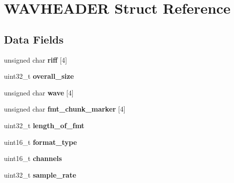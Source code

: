 \hypertarget{struct_w_a_v_h_e_a_d_e_r}{}\section{W\+A\+V\+H\+E\+A\+D\+ER Struct Reference}
\label{struct_w_a_v_h_e_a_d_e_r}
\subsection*{Data Fields}
\begin{DoxyCompactItemize}
\item 
\mbox{\label{struct_w_a_v_h_e_a_d_e_r_a5a14600e998a7fa28053a93ab69c59dc}} 
unsigned char {\bfseries riff} \mbox{[}4\mbox{]}
\item 
\mbox{\label{struct_w_a_v_h_e_a_d_e_r_aa32738f840f2e1f11fbb3d6934e3cee1}} 
uint32\+\_\+t {\bfseries overall\+\_\+size}
\item 
\mbox{\label{struct_w_a_v_h_e_a_d_e_r_a847be343b633c0ccaea5c0637431f56d}} 
unsigned char {\bfseries wave} \mbox{[}4\mbox{]}
\item 
\mbox{\label{struct_w_a_v_h_e_a_d_e_r_a69fff31085a4de24601ae5d45d70adc6}} 
unsigned char {\bfseries fmt\+\_\+chunk\+\_\+marker} \mbox{[}4\mbox{]}
\item 
\mbox{\label{struct_w_a_v_h_e_a_d_e_r_ab504bcdcab131e8fce33301bcd992746}} 
uint32\+\_\+t {\bfseries length\+\_\+of\+\_\+fmt}
\item 
\mbox{\label{struct_w_a_v_h_e_a_d_e_r_a73aa611a5cbe6339ffb26a697f6c13e2}} 
uint16\+\_\+t {\bfseries format\+\_\+type}
\item 
\mbox{\label{struct_w_a_v_h_e_a_d_e_r_a5cd1397103e8325b454a096624b4ac9e}} 
uint16\+\_\+t {\bfseries channels}
\item 
\mbox{\label{struct_w_a_v_h_e_a_d_e_r_abaa0dc07cc2af766269066d222775c8b}} 
uint32\+\_\+t {\bfseries sample\+\_\+rate}
\item 
\mbox{\label{struct_w_a_v_h_e_a_d_e_r_aed048489e477e45c176d30fa9dff69da}} 

\end{DoxyCompactItemize}
